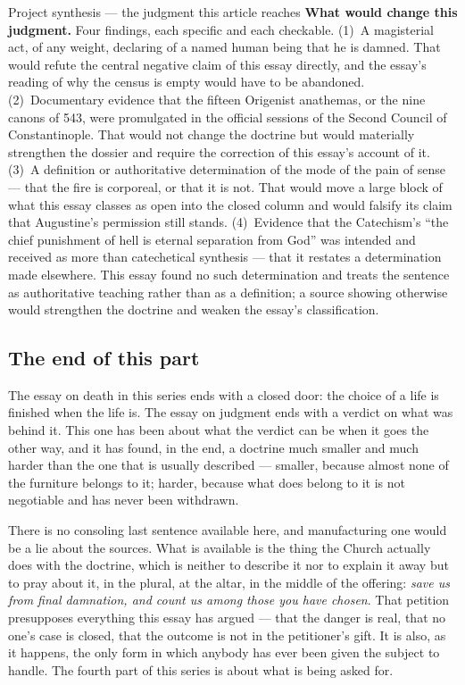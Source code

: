 \begin{studybox}{Project synthesis --- the judgment this article reaches}
\textbf{What would change this judgment.} Four findings, each specific and each checkable. (1)~A magisterial act, of any weight, declaring of a named human being that he is damned. That would refute the central negative claim of this essay directly, and the essay's reading of why the census is empty would have to be abandoned. (2)~Documentary evidence that the fifteen Origenist anathemas, or the nine canons of 543, were promulgated in the official sessions of the Second Council of Constantinople. That would not change the doctrine but would materially strengthen the dossier and require the correction of this essay's account of it. (3)~A definition or authoritative determination of the mode of the pain of sense --- that the fire is corporeal, or that it is not. That would move a large block of what this essay classes as open into the closed column and would falsify its claim that Augustine's permission still stands. (4)~Evidence that the Catechism's ``the chief punishment of hell is eternal separation from God'' was intended and received as more than catechetical synthesis --- that it restates a determination made elsewhere. This essay found no such determination and treats the sentence as authoritative teaching rather than as a definition; a source showing otherwise would strengthen the doctrine and weaken the essay's classification.
\end{studybox}

\subsection{The end of this part}

The essay on death in this series ends with a closed door: the choice of a life is finished when the life is. The essay on judgment ends with a verdict on what was behind it. This one has been about what the verdict can be when it goes the other way, and it has found, in the end, a doctrine much smaller and much harder than the one that is usually described --- smaller, because almost none of the furniture belongs to it; harder, because what does belong to it is not negotiable and has never been withdrawn.

There is no consoling last sentence available here, and manufacturing one would be a lie about the sources. What is available is the thing the Church actually does with the doctrine, which is neither to describe it nor to explain it away but to pray about it, in the plural, at the altar, in the middle of the offering: \emph{save us from final damnation, and count us among those you have chosen}. That petition presupposes everything this essay has argued --- that the danger is real, that no one's case is closed, that the outcome is not in the petitioner's gift. It is also, as it happens, the only form in which anybody has ever been given the subject to handle. The fourth part of this series is about what is being asked for.

